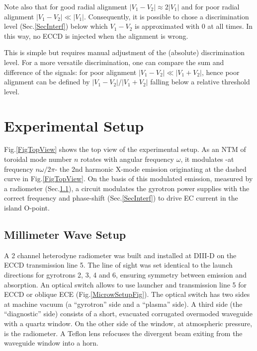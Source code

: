 \documentclass[aps,pra,twocolumn]{revtex4}
\begin{document}
Note also that for good radial alignment $| V_1-V_2 | \approx 2|V_1|$ 
and for poor radial alignment $| V_1-V_2 | \ll |V_1|$. Consequently, it is 
possible to chose a discrimination level (Sec.\ref{SecInterf}) below which 
$V_1-V_2$ is approximated with 0 at all times. In this way, no ECCD is injected 
when the alignment is wrong. 

This is simple but requires manual adjustment of the (absolute) 
discrimination level. 
For a more versatile discrimination, one can compare the sum and difference 
of the signals: 
for poor alignment $| V_1-V_2 | \ll | V_1+V_2|$, hence poor alignment can be 
defined by $| V_1-V_2 | / | V_1+V_2|$ falling below a relative threshold 
level. 



\section{Experimental Setup}  \label{SecExpSet}
Fig.\ref{FigTopView} shows the top view of the experimental setup. 
As an NTM of toroidal mode number $n$ rotates with angular frequency 
$\omega$, it modulates -at frequency $n\omega/2\pi$- the 2nd harmonic 
X-mode emission originating at the dashed curve in Fig.\ref{FigTopView}. 
On the basis of this modulated emission, measured by a radiometer 
(Sec.\ref{Sec_muWaveSetup}), a circuit modulates the gyrotron power supplies 
with the correct frequency and phase-shift  
(Sec.\ref{SecInterf}) to drive EC current in the island O-point. 

\subsection{Millimeter Wave Setup}  \label{Sec_muWaveSetup}
A 2 channel heterodyne radiometer was built and installed at
DIII-D on the ECCD transmission line 5. 
The line of sight was set identical to the launch directions for 
gyrotrons 2, 3, 4 and 6, ensuring symmetry between 
emission and absorption. 
An optical switch allows to use launcher and transmission line 5  
for ECCD or oblique ECE (Fig.\ref{MicrowSetupFig}).
The optical switch has two sides at machine vacuum (a ``gyrotron'' 
side and a ``plasma'' side). A third side (the ``diagnostic'' side) 
consists of a short, evacuated corrugated overmoded waveguide with a quartz 
window. On the other side of the window, at atmospheric pressure, 
is the radiometer. A Teflon lens refocuses the divergent beam exiting from the 
waveguide window into a horn. 
\end{document}
